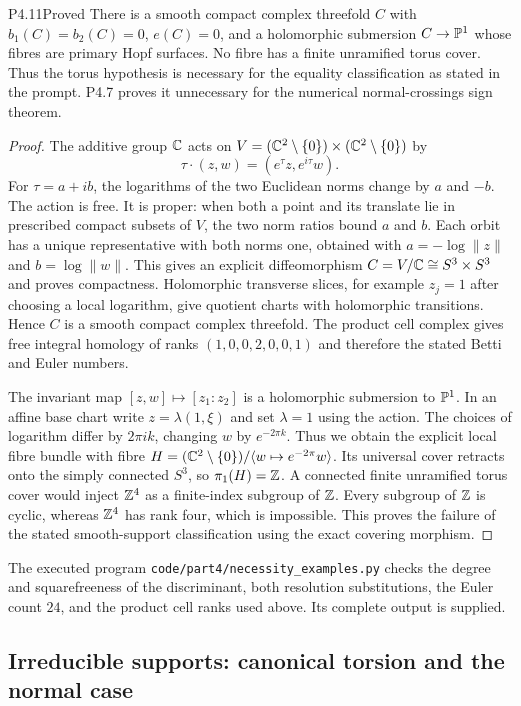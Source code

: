 \begin{statement}{P4.11}{Proved}
There is a smooth compact complex threefold $C$ with
$b_1(C)=b_2(C)=0$, $e(C)=0$, and a holomorphic submersion
$C\to\mathbb P^1$ whose fibres are primary Hopf surfaces. No fibre has
a finite unramified torus cover. Thus the torus hypothesis is
necessary for the equality classification as stated in the prompt.
P4.7 proves it unnecessary for the numerical normal-crossings
sign theorem.
\end{statement}
\begin{proof}
The additive group $\mathbb C$ acts on
$V=(\mathbb C^2\setminus\{0\})\times(\mathbb C^2\setminus\{0\})$ by
\[
 \tau\cdot(z,w)=(e^\tau z,e^{i\tau}w).
\]
For $\tau=a+ib$, the logarithms of the two Euclidean norms change
by $a$ and $-b$. The action is free. It is proper: when both a
point and its translate lie in prescribed compact subsets of $V$,
the two norm ratios bound $a$ and $b$. Each orbit has a unique
representative with both norms one, obtained with
$a=-\log\|z\|$ and $b=\log\|w\|$. This gives an explicit
diffeomorphism $C=V/\mathbb C\cong S^3\times S^3$ and proves compactness.
Holomorphic transverse slices, for example $z_j=1$ after choosing
a local logarithm, give quotient charts with holomorphic
transitions. Hence $C$ is a smooth compact complex threefold.
The product cell complex gives free integral homology of ranks
$(1,0,0,2,0,0,1)$ and therefore the stated Betti and Euler numbers.

The invariant map $[z,w]\mapsto[z_1:z_2]$ is a holomorphic
submersion to $\mathbb P^1$. In an affine base chart write
$z=\lambda(1,\xi)$ and set $\lambda=1$ using the action.
The choices of logarithm differ by $2\pi ik$, changing $w$ by
$e^{-2\pi k}$. Thus we obtain the explicit local fibre bundle
with fibre
$H=(\mathbb C^2\setminus\{0\})/\langle w\mapsto e^{-2\pi}w\rangle$.
Its universal cover retracts onto the simply connected $S^3$, so
$\pi_1(H)=\mathbb Z$. A connected finite unramified torus cover would
inject $\mathbb Z^4$ as a finite-index subgroup of $\mathbb Z$. Every subgroup
of $\mathbb Z$ is cyclic, whereas $\mathbb Z^4$ has rank four, which is
impossible. This proves the failure of the stated smooth-support
classification using the exact covering morphism.
\end{proof}

The executed program \texttt{code/part4/necessity\_examples.py}
checks the degree and squarefreeness of the discriminant, both
resolution substitutions, the Euler count $24$, and the product
cell ranks used above. Its complete output is supplied.

\subsection{Irreducible supports: canonical torsion and the normal case}

